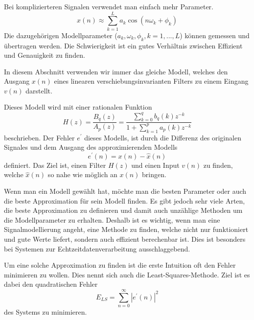 Bei komplizierteren Signalen verwendet man einfach mehr Parameter.
\begin{equation}
x(n) \approx \sum_{k=1}^{L} a_{k} \cos \left(n \omega_{k}+\phi_{k}\right)
\end{equation}
Die dazugehörigen Modellparameter ($a_k,\omega_{k},\phi_{k},k=1,...,L$) können gemessen und übertragen werden.
Die Schwierigkeit ist ein gutes Verhältnis zwischen Effizient und Genauigkeit zu finden. 

In diesem Abschnitt verwenden wir immer das gleiche Modell, welches den Ausgang $x(n)$ eines linearen verschiebungsinvarianten Filters zu einem Eingang $v(n)$ darstellt.  
\begin{center}
\end{center}
Dieses Modell wird mit einer rationalen Funktion
\begin{equation}
H(z)
=
\frac{B_{q}(z)}{A_{p}(z)}
=
\frac{\displaystyle\sum_{k=0}^{q} b_{q}(k) z^{-k}}{1+\displaystyle\sum_{k=1}^{p} a_{p}(k) z^{-k}}
\label{pade:uebertragungsfunktion}
\end{equation}
beschrieben.
Der Fehler $e^{\prime}$ dieses Modells, ist durch die Differenz des originalen Signales und dem Ausgang des approximierenden Modells
\begin{equation}
e^{\prime}(n)=x(n)-\hat{x}(n)
\end{equation}
definiert. 
Das Ziel ist, einen Filter $H(z)$ und einen Input $v(n)$ zu finden, welche
$\hat{x}(n)$ so nahe wie möglich an $x(n)$ bringen.

Wenn man ein Modell gewählt hat, möchte man die besten Parameter oder auch die beste Approximation für sein Modell finden.
Es gibt jedoch sehr viele Arten, die beste Approximation zu definieren und damit auch unzählige Methoden um die Modellparameter zu erhalten.
Deshalb ist es wichtig, wenn man eine Signalmodellierung angeht,
eine Methode zu finden, welche nicht nur funktioniert und gute Werte
liefert, sondern auch effizient berechenbar ist.
Dies ist besonders bei Systemen zur Echtzeitdatenverarbeitung ausschlaggebend.
%

Um eine solche Approximation zu finden ist die erste Intuition oft den Fehler minimieren zu wollen.
Dies nennt sich auch die Least-Squares-Methode.
%
Ziel ist es dabei den quadratischen Fehler 
%
\begin{equation}
E_{L S}
=
\sum_{n=0}^{\infty}\left|e^{\prime}(n)\right|^{2}
\end{equation}
des Systems zu minimieren.

